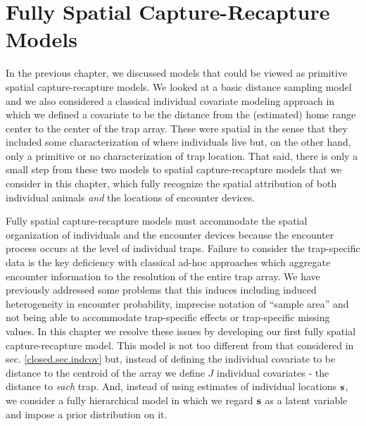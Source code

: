 




\chapter{Fully Spatial Capture-Recapture Models}
\label{chapt.scr0}

\vspace{.3in}

In the previous chapter, we discussed models that could be
viewed as primitive spatial capture-recapture models. We looked at a
basic distance sampling model and we also considered a classical
individual covariate modeling approach in which we defined a covariate
to be the distance from the (estimated) home range center to the center of
the trap array. These were spatial in the sense that they included
some characterization of where individuals live but, on the other
hand, only a primitive or no characterization of trap location.  That
said, there is only a small step from these two models to spatial
capture-recapture models that we consider in this chapter, which fully
recognize the spatial attribution of both individual animals {\it and}
the locations of encounter devices.

Fully spatial capture-recapture models must accommodate the spatial
organization of individuals and the encounter devices because the
encounter process occurs at the level of individual traps.  Failure to
consider the trap-specific data is the key deficiency
with classical ad-hoc approaches which aggregate encounter information
to the resolution of the entire trap array. We have  previously
addressed some problems that this induces including induced
heterogeneity in encounter probability, imprecise notation of ``sample
area'' and not being able to accommodate trap-specific
effects or trap-specific missing values.
In this chapter we resolve these issues by developing
our first fully spatial capture-recapture
model. This model is not too different from
that considered in sec. \ref{closed.sec.indcov} but,
instead of defining the individual covariate to be distance
to the centroid of the array we define $J$ individual covariates - the
distance to {\it each} trap. And, instead of using estimates of
individual locations ${\bf s}$, we consider a fully hierarchical model in
which we regard ${\bf s}$ as a latent variable and impose a prior
distribution on it.

